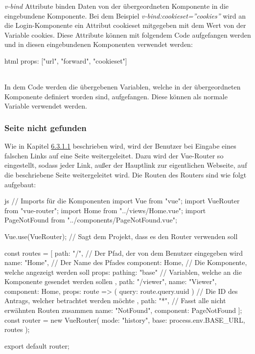 \textit{v-bind} Attribute binden Daten von der übergeordneten Komponente in die eingebundene Komponente. Bei dem Beispiel \textit{v-bind:cookieset=''cookies''} wird an die Login-Komponente ein Attribut cookieset mitgegeben mit dem Wert von der Variable cookies.
\newpage
Diese Attribute können mit folgendem Code aufgefangen werden und in diesen eingebundenen Komponenten verwendet werden:
\begin{code}{html}
		props: ["url", "forward", "cookieset"]
\end{code}
~\\
In dem Code werden die übergebenen Variablen, welche in der übergeordneten Komponente definiert worden sind, aufgefangen. Diese können als normale Variable verwendet werden.
\newpage
\subsubsection{Seite nicht gefunden}
Wie in Kapitel \hyperref[sec:not_found]{6.3.1.1} beschrieben wird, wird der Benutzer bei Eingabe eines falschen Links auf eine Seite weitergeleitet. Dazu wird der Vue-Router so eingestellt, sodass jeder Link, außer der Hauptlink zur eigentlichen Webseite, auf die beschriebene Seite weitergeleitet wird. Die Routen des Routers sind wie folgt aufgebaut:
\begin{code}{js}
// Imports für die Komponenten
import Vue from "vue";
import VueRouter from "vue-router";
import Home from "../views/Home.vue";
import PageNotFound from "../components/PageNotFound.vue";

Vue.use(VueRouter);		// Sagt dem Projekt, dass es den Router verwenden soll

const routes = [
{
	path: "/",					// Der Pfad, der von dem Benutzer eingegeben wird
	name: "Home",				// Der Name des Pfades
	component: Home,			// Die Komponente, welche angezeigt werden soll
	props: { pathing: "base" }	// Variablen, welche an die Komponente gesendet werden sollen
},
{
	path: "/viewer",
	name: "Viewer",
	component: Home,
	props: route => ({ query: route.query.uuid })	// Die ID des Antrags, welcher betrachtet werden möchte
},
{
	path: "*",				// Fasst alle nicht erwähnten Routen zusammen
	name: "NotFound",
	component: PageNotFound
}
];
const router = new VueRouter({
	mode: "history",
	base: process.env.BASE_URL,
	routes
});

export default router;
\end{code}
~\\

